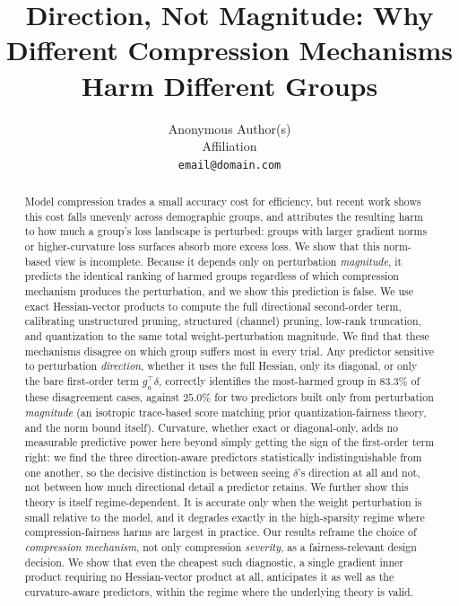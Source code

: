 \documentclass{article}
\title{Direction, Not Magnitude: Why Different Compression Mechanisms\\ Harm Different Groups}
\author{%
  Anonymous Author(s)\\
  Affiliation\\
  \texttt{email@domain.com}
}
\begin{document}
\maketitle

\begin{abstract}
Model compression trades a small accuracy cost for efficiency, but recent work shows this cost falls unevenly across demographic groups, and attributes the resulting harm to how much a group's loss landscape is perturbed: groups with larger gradient norms or higher-curvature loss surfaces absorb more excess loss. We show that this norm-based view is incomplete. Because it depends only on perturbation \emph{magnitude}, it predicts the identical ranking of harmed groups regardless of which compression mechanism produces the perturbation, and we show this prediction is false. We use exact Hessian-vector products to compute the full directional second-order term, calibrating unstructured pruning, structured (channel) pruning, low-rank truncation, and quantization to the same total weight-perturbation magnitude. We find that these mechanisms disagree on which group suffers most in every trial. Any predictor sensitive to perturbation \emph{direction}, whether it uses the full Hessian, only its diagonal, or only the bare first-order term $g_a^\top\delta$, correctly identifies the most-harmed group in $83.3\%$ of these disagreement cases, against $25.0\%$ for two predictors built only from perturbation \emph{magnitude} (an isotropic trace-based score matching prior quantization-fairness theory, and the norm bound itself). Curvature, whether exact or diagonal-only, adds no measurable predictive power here beyond simply getting the sign of the first-order term right: we find the three direction-aware predictors statistically indistinguishable from one another, so the decisive distinction is between seeing $\delta$'s direction at all and not, not between how much directional detail a predictor retains. We further show this theory is itself regime-dependent. It is accurate only when the weight perturbation is small relative to the model, and it degrades exactly in the high-sparsity regime where compression-fairness harms are largest in practice. Our results reframe the choice of \emph{compression mechanism}, not only compression \emph{severity}, as a fairness-relevant design decision. We show that even the cheapest such diagnostic, a single gradient inner product requiring no Hessian-vector product at all, anticipates it as well as the curvature-aware predictors, within the regime where the underlying theory is valid.
\end{abstract}
\end{document}
